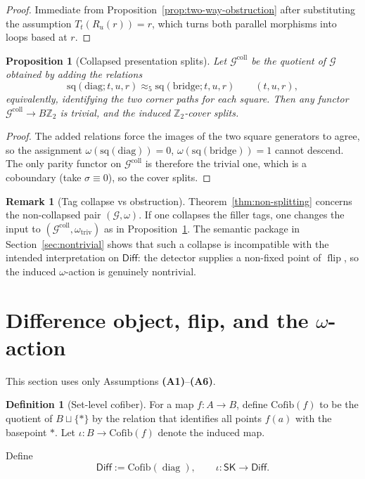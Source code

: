 \documentclass[aps,prl,reprint]{revtex4-2}
\newcommand{\SK}{\mathsf{SK}}
\newcommand{\Diff}{\mathsf{Diff}}
\newcommand{\diag}{\operatorname{diag}}
\newcommand{\flip}{\operatorname{flip}}
\newcommand{\Ztwo}{\mathbb{Z}_2}
\theoremstyle{definition}
\newtheorem{definition}{Definition}[section]
\newtheorem{remark}{Remark}[section]
\theoremstyle{plain}
\newtheorem{proposition}{Proposition}[section]
\begin{document}
\begin{proof}
Immediate from Proposition~\ref{prop:two-way-obstruction} after substituting the
assumption $T_t(R_u(r))=r$, which turns both parallel morphisms into loops based at $r$.
\end{proof}

\begin{proposition}[Collapsed presentation splits]
\label{prop:collapsed-splits}
Let $\mathcal G^{\mathrm{coll}}$ be the quotient of $\mathcal G$ obtained by adding the relations
\[
\mathrm{sq}(\mathrm{diag};t,u,r)\approx_5 \mathrm{sq}(\mathrm{bridge};t,u,r)\qquad (t,u,r),
\]
equivalently, identifying the two corner paths for each square. Then any functor
$\mathcal G^{\mathrm{coll}}\to B\Ztwo$ is trivial, and the induced $\Ztwo$-cover splits.
\end{proposition}

\begin{proof}
The added relations force the images of the two square generators to agree, so the
assignment $\omega(\mathrm{sq}(\mathrm{diag}))=0$, $\omega(\mathrm{sq}(\mathrm{bridge}))=1$
cannot descend. The only parity functor on $\mathcal G^{\mathrm{coll}}$ is therefore the
trivial one, which is a coboundary (take $\sigma\equiv 0$), so the cover splits.
\end{proof}

\begin{remark}[Tag collapse vs obstruction]
\label{rem:limited-scope-theorem-translation-clean-006}
Theorem~\ref{thm:non-splitting} concerns the non-collapsed pair $(\mathcal G,\omega)$.
If one collapses the filler tags, one changes the input to $(\mathcal G^{\mathrm{coll}},
\omega_{\mathrm{triv}})$ as in Proposition~\ref{prop:collapsed-splits}. The semantic
package in Section~\ref{sec:nontrivial} shows that such a collapse is incompatible with
the intended interpretation on $\Diff$: the detector supplies a non-fixed point of $\flip$,
so the induced $\omega$-action is genuinely nontrivial.
\end{remark}

\section{Difference object, flip, and the $\omega$-action}
\label{sec:diff}
This section uses only Assumptions \textbf{(A1)}--\textbf{(A6)}.

\begin{definition}[Set-level cofiber]
\label{def:limited-scope-theorem-translation-clean-006}
For a map $f:A\to B$, define $\mathrm{Cofib}(f)$ to be the quotient of
$B\sqcup\{\ast\}$ by the relation that identifies all points $f(a)$ with the basepoint
$\ast$. Let $\iota:B\to\mathrm{Cofib}(f)$ denote the induced map.

Define
\[\Diff:=\mathrm{Cofib}(\diag),\qquad \iota:\SK\to\Diff.\]

\end{definition}
\end{document}
